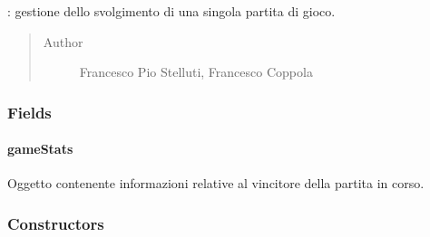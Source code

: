 \documentclass[letterpaper,10pt,italian]{sphinxmanual}
\begin{document}
\begin{fulllineitems}
\label{\detokenize{source/it/unicam/cs/pa/mastermind/gamecore/SingleMatch:it.unicam.cs.pa.mastermind.gamecore.SingleMatch}}
: gestione dello svolgimento di una singola partita di gioco.
\begin{quote}\begin{description}
\item[{Author}] \leavevmode
Francesco Pio Stelluti, Francesco Coppola

\end{description}\end{quote}

\end{fulllineitems}



\subsubsection{Fields}
\label{\detokenize{source/it/unicam/cs/pa/mastermind/gamecore/SingleMatch:fields}}

\paragraph{gameStats}
\label{\detokenize{source/it/unicam/cs/pa/mastermind/gamecore/SingleMatch:gamestats}}

\begin{fulllineitems}
\label{\detokenize{source/it/unicam/cs/pa/mastermind/gamecore/SingleMatch:it.unicam.cs.pa.mastermind.gamecore.SingleMatch.gameStats}}
Oggetto contenente informazioni relative al vincitore della partita in corso.

\end{fulllineitems}



\subsubsection{Constructors}
\label{\detokenize{source/it/unicam/cs/pa/mastermind/gamecore/SingleMatch:constructors}}
\end{document}
